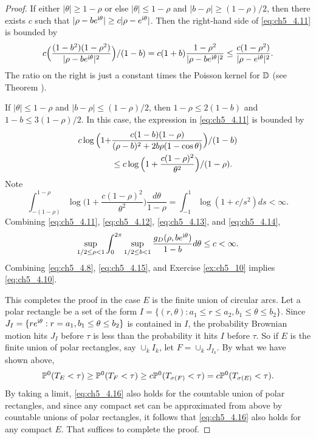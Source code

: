 \begin{proof}
If either $|\theta| \geq 1-\rho$ or else $|\theta| \leq 1-\rho$ and $|b-\rho| \geq (1-\rho)/2$, then there exists $c$ such that $|\rho - be^{\im\theta}| \geq c|\rho - e^{\im\theta}|$. Then the right-hand side of \eqref{eq:ch5_4.11} is bounded by
\begin{equation}\label{eq:ch5_4.12}
    c\Big(\frac{(1-b^2)(1-\rho^2)}{|\rho - be^{\im\theta}|^2}\Big)/(1-b) = c(1+b)\frac{1-\rho^2}{|\rho - be^{\im\theta}|^2} \leq \frac{c(1-\rho^2)}{|\rho - e^{\im\theta}|^2}.
\end{equation}
The ratio on the right is just a constant times the Poisson kernel for $\D$ (see Theorem ).

If $|\theta| \leq 1-\rho$ and $|b-\rho| \leq (1-\rho)/2$, then $1-\rho \leq 2(1-b)$ and $1-b \leq 3(1-\rho)/2$. In this case, the expression in \eqref{eq:ch5_4.11} is bounded by
\begin{align}\label{eq:ch5_4.13}
    c\log\Big(1 + &\frac{c(1-b)(1-\rho)}{(\rho-b)^2 + 2b\rho(1-\cos\theta)}\Big)/(1-b) \\
    &\leq c\log\Big(1 + \frac{c(1-\rho)^2}{\theta^2}\Big)/(1-\rho). \notag
\end{align}
Note
\begin{equation}\label{eq:ch5_4.14}
    \int_{-(1-\rho)}^{1-\rho} \log\Big(1 + \frac{c(1-\rho)^2}{\theta^2}\Big)\frac{d\theta}{1-\rho} = \int_{-1}^1 \log(1 + c/s^2)ds < \infty.
\end{equation}
Combining \eqref{eq:ch5_4.11}, \eqref{eq:ch5_4.12}, \eqref{eq:ch5_4.13}, and \eqref{eq:ch5_4.14},
\begin{equation}\label{eq:ch5_4.15}
    \sup_{1/2\leq\rho<1}\int_0^{2\pi} \sup_{1/2\leq b<1} \frac{g_D(\rho,be^{\im\theta})}{1-b}d\theta \leq c < \infty.
\end{equation}
Combining \eqref{eq:ch5_4.8}, \eqref{eq:ch5_4.15}, and Exercise \ref{ex:ch5_10} implies \eqref{eq:ch5_4.10}.

This completes the proof in the case $E$ is the finite union of circular arcs. Let a polar rectangle be a set of the form $I = \{(r,\theta) : a_1 \leq r \leq a_2, b_1 \leq \theta \leq b_2\}$. Since $J_I = \{re^{\im\theta} : r = a_1, b_1 \leq \theta \leq b_2\}$ is contained in $I$, the probability Brownian motion hits $J_I$ before $\tau$ is less than the probability it hits $I$ before $\tau$. So if $E$ is the finite union of polar rectangles, say $\cup_k I_k$, let $F = \cup_k J_{I_k}$. By what we have shown above,
\begin{equation}\label{eq:ch5_4.16}
    \P^0(T_E < \tau) \geq \P^0(T_F < \tau) \geq c\P^0(T_{\sigma(F)} < \tau) = c\P^0(T_{\sigma(E)} < \tau).
\end{equation}
By taking a limit, \eqref{eq:ch5_4.16} also holds for the countable union of polar rectangles, and since any compact set can be approximated from above by countable unions of polar rectangles, it follows that \eqref{eq:ch5_4.16} also holds for any compact $E$. That suffices to complete the proof.
\end{proof}


